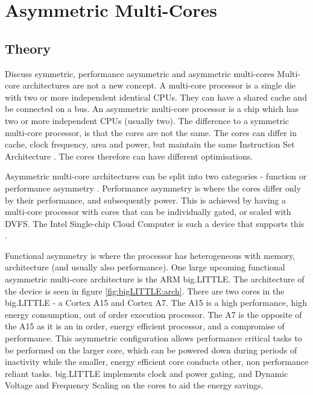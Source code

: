 
\section{Asymmetric Multi-Cores}

\subsection{Theory}
Discuss symmetric, performance asymmetric and asymmetric multi-cores
Multi-core architectures are not a new concept. 
A multi-core processor is a single die with two or more independent identical CPUs. 
They can have a shared cache and be connected on a bus.
An asymmetric multi-core processor is a chip which has two or more independent CPUs (usually two).
The difference to a symmetric multi-core processor, is that the cores are not the same. 
The cores can differ in cache, clock frequency, area and power, but maintain the same Instruction Set Architecture \cite{de2012power}.
The cores therefore can have different optimisations.


Asymmetric multi-core architectures can be split into two categories - function or performance asymmetry \cite{wang2012energy}.
Performance asymmetry is where the cores differ only by their performance, and subsequently power. 
This is achieved by having a multi-core processor with cores that can be individually gated, or scaled with DVFS.
The Intel Single-chip Cloud Computer is such a device that supports this \cite{IntelSCC}.

Functional asymmetry is where the processor has heterogeneous with memory, architecture (and usually also performance).
One large upcoming functional asymmetric multi-core architecture is the ARM big.LITTLE. 
The architecture of the device is seen in figure \ref{fig:bigLITTLE:arch}.
There are two cores in the big.LITTLE - a Cortex A15 and Cortex A7.
The A15 is a high performance, high energy consumption, out of order execution processor.
The A7 is the opposite of the A15 as it is an in order, energy efficient processor, and a compromise of performance.
This asymmetric configuration allows performance critical tasks to be performed on the larger core, which can be powered down during periods of inactivity while the smaller, energy efficient core conducts other, non performance reliant tasks.
big.LITTLE implements clock and power gating, and Dynamic Voltage and Frequency Scaling on the cores to aid the energy savings.


